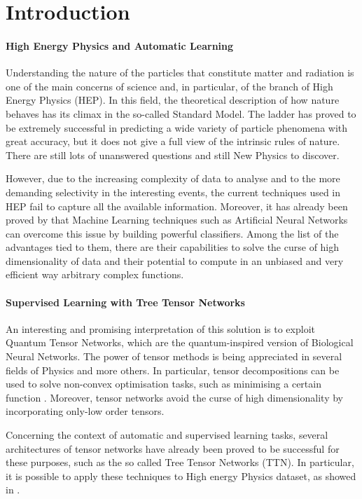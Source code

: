 \documentclass[../main/main.tex]{subfiles}
\begin{document}
\section{Introduction}

\paragraph{High Energy Physics and Automatic Learning}
Understanding the nature of the particles that constitute matter and radiation is one of the main concerns of science and, in particular, of the branch of High Energy Physics (HEP). In this field, the theoretical description of how nature behaves has its climax in the so-called Standard Model. The ladder has proved to be extremely successful in predicting a wide variety of particle phenomena with great accuracy, but it does not give a full view of the intrinsic rules of nature. There are still lots of unanswered questions and still New Physics to discover.

However, due to the increasing complexity of data to analyse and to the more demanding selectivity in the interesting events, the current techniques used in HEP fail to capture all the available information. Moreover, it has already been proved by \cite{baldi} that Machine Learning techniques such as Artificial Neural Networks can overcome this issue by building powerful classifiers. Among the list of the advantages tied to them, there are their capabilities to solve the curse of high dimensionality of data and their potential to compute in an unbiased and very efficient way arbitrary complex functions.


\paragraph{Supervised Learning with Tree Tensor Networks}
An interesting and promising interpretation of this solution is to exploit Quantum Tensor Networks, which are the quantum-inspired version of Biological Neural Networks.
The power of tensor methods is being appreciated in several fields of Physics and more others. In particular, tensor decompositions can be used to solve non-convex optimisation tasks, such as minimising a certain function \cite{stoudenmire}. Moreover, tensor networks avoid the curse of high dimensionality by incorporating only-low order tensors.

Concerning the context of automatic and supervised learning tasks, several architectures of tensor networks have already been proved to be successful for these purposes, such as the so called Tree Tensor Networks (TTN). In particular, it is possible to apply these techniques to High energy Physics dataset, as showed in \cite{montangero}.
\end{document}
